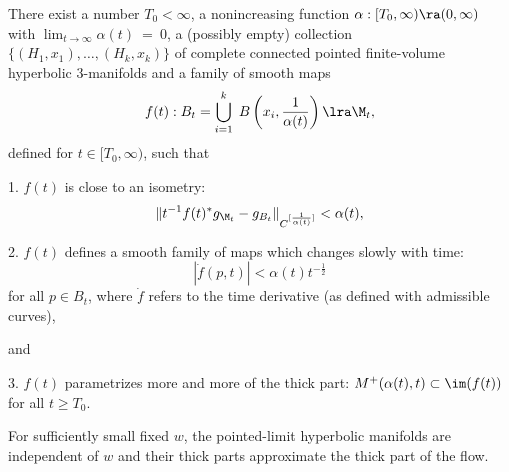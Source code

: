 \begin{proposition}
  \label{prop:kl-hyperbolic-rigidity-stabilization-thick-part-monotonicity-thick-thin-geometry}

\label{slowisotopy}
There exist a number $T_0<\infty$, a nonincreasing function
$\alpha:[T_0,\infty)\ra (0,\infty)$ with
$\lim_{t \rightarrow \infty} \alpha(t) \: = \: 0$,
a (possibly empty) collection
$\{(H_1,x_1),\ldots,(H_k,x_k)\}$
of complete connected pointed finite-volume hyperbolic $3$-manifolds
and a family of smooth maps
\begin{equation}
f(t):B_t= \bigcup_{i=1}^k \;B \left( x_i, \frac{1}{\alpha(t)} \right)\lra \M_t,
\end{equation}
 defined for $t\in [T_0,\infty)$, such that

1.  $f(t)$ is close to an isometry:
\begin{equation}
\|t^{-1}f(t)^*g_{\M_t}-g_{B_t}\|_{C^{[\frac{1}{\alpha(t)}]}}<\alpha(t),
\end{equation}

2. $f(t)$ defines a smooth family of maps which changes slowly
with time:
\begin{equation}
|\dot{f}(p,t)|<\alpha(t)t^{-\frac12}
\end{equation}
for all $p\in B_t$,
where $\dot{f}$ refers to the time derivative (as defined
with admissible curves),

and

3. $f(t)$ parametrizes more and more of the thick part:
 $M^+(\alpha(t),t)\subset \im(f(t))$ for all $t\geq T_0$.
\end{proposition}

\begin{remark}
\label{rem:kl-hyperbolic-rigidity-stabilization-thick-part-characterization-thick-thin-geometry}

For sufficiently small fixed $w$, the pointed-limit hyperbolic manifolds are independent of $w$ and their thick parts approximate the thick part of the flow.
\end{remark}

